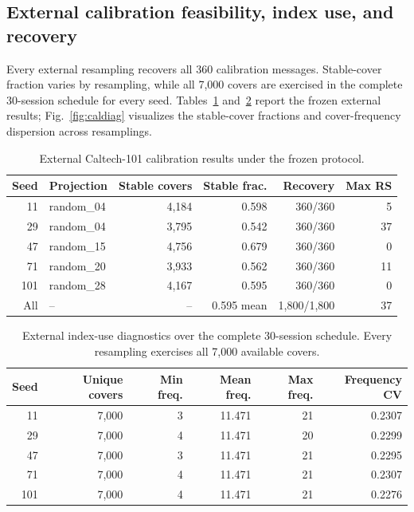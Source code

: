 
\subsection{External calibration feasibility, index use, and recovery}
Every external resampling recovers all 360 calibration messages. Stable-cover fraction varies by resampling, while all 7,000 covers are exercised in the complete 30-session schedule for every seed. Tables~\ref{tab:calibration} and~\ref{tab:indexuse} report the frozen external results; Fig.~\ref{fig:caldiag} visualizes the stable-cover fractions and cover-frequency dispersion across resamplings.

\begin{table}[!htbp]
\caption{External Caltech-101 calibration results under the frozen protocol.}
\label{tab:calibration}
\small
\begin{tabular}{r l r r r r}
\toprule
Seed & Projection & Stable covers & Stable frac. & Recovery & Max RS\\
\midrule
11 & random\_04 & 4,184 & 0.598 & 360/360 & 5\\
29 & random\_04 & 3,795 & 0.542 & 360/360 & 37\\
47 & random\_15 & 4,756 & 0.679 & 360/360 & 0\\
71 & random\_20 & 3,933 & 0.562 & 360/360 & 11\\
101 & random\_28 & 4,167 & 0.595 & 360/360 & 0\\
\midrule
All & -- & -- & 0.595 mean & 1,800/1,800 & 37\\
\bottomrule
\end{tabular}
\end{table}

\begin{table}[!htbp]
\caption{External index-use diagnostics over the complete 30-session schedule. Every resampling exercises all 7,000 available covers.}
\label{tab:indexuse}
\small
\begin{tabular}{rrrrrr}
\toprule
Seed & Unique covers & Min freq. & Mean freq. & Max freq. & Frequency CV\\
\midrule
11&7,000&3&11.471&21&0.2307\\
29&7,000&4&11.471&20&0.2299\\
47&7,000&3&11.471&21&0.2295\\
71&7,000&4&11.471&21&0.2307\\
101&7,000&4&11.471&21&0.2276\\
\bottomrule
\end{tabular}
\end{table}

